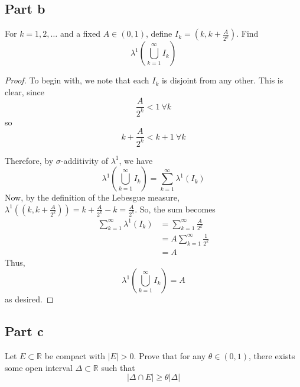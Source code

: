 \documentclass[fontsize=11pt]{scrartcl} %
\numberwithin{equation}{section} %
\numberwithin{figure}{section} %
\numberwithin{table}{section} %
\newcommand{\R}{\mathbb{R}}
\begin{document}
\subsection*{Part b}
For $k=1,2,\ldots$ and a fixed $A\in(0,1)$, define $I_k = (k,k+\frac{A}{2^k})$.
Find
\[
\lambda^1\left(\bigcup_{k=1}^{\infty}I_k\right)
\]

\begin{proof}
To begin with, we note that each $I_k$ is disjoint from any other. This is clear, since
\[
\frac{A}{2^k} < 1\ \forall k
\]
so
\[
k+\frac{A}{2^k} < k+1\ \forall k
\]

Therefore, by $\sigma$-additivity of $\lambda^1$, we have
\[
\lambda^1\left(\bigcup_{k=1}^{\infty}I_k\right) = \sum_{k=1}^{\infty}\lambda^1(I_k)
\]
Now, by the definition of the Lebesgue measure, $\lambda^1((k,k+\frac{A}{2^k})) = k+\frac{A}{2^k} - k = \frac{A}{2^k}$.
So, the sum becomes
\[
\begin{aligned}
\sum_{k=1}^{\infty}\lambda^1(I_k)   &= \sum_{k=1}^{\infty}\frac{A}{2^k}\\
                                    &= A\sum_{k=1}^{\infty}\frac{1}{2^k}\\
                                    &= A
\end{aligned}
\]
Thus, 
\[
\lambda^1\left(\bigcup_{k=1}^{\infty}I_k\right) = A
\]
as desired.
\end{proof}

\subsection*{Part c}
Let $E\subset \R$ be compact with $|E|>0$. Prove that for any $\theta \in (0,1)$,
there exists some open interval $\Delta\subset \R$ such that
\[
|\Delta\cap E| \geq \theta |\Delta|
\]
\end{document}
